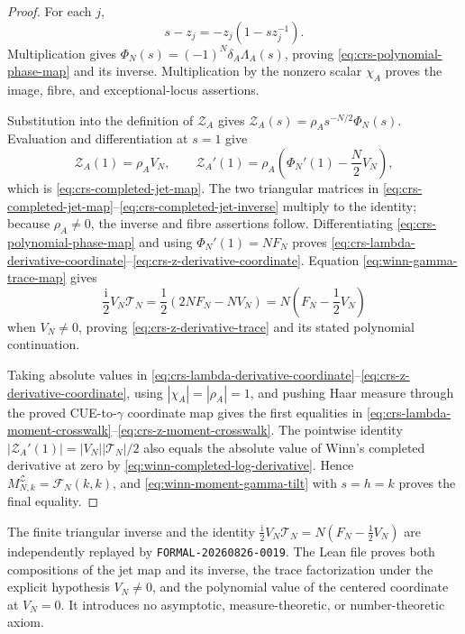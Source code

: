 \begin{proof}
For each $j$,
\[
 s-z_j=-z_j(1-sz_j^{-1}).
\]
Multiplication gives
$\Phi_N(s)=(-1)^N\delta_A\Lambda_A(s)$, proving
\eqref{eq:crs-polynomial-phase-map} and its inverse.  Multiplication by the
nonzero scalar $\chi_A$ proves the image, fibre, and exceptional-locus assertions.

Substitution into the definition of $\mathcal Z_A$ gives
$\mathcal Z_A(s)=\rho_A s^{-N/2}\Phi_N(s)$.  Evaluation and differentiation
at $s=1$ give
\[
 \mathcal Z_A(1)=\rho_A V_N,\qquad
 \mathcal Z_A'(1)=\rho_A\left(\Phi_N'(1)-\frac N2V_N\right),
\]
which is \eqref{eq:crs-completed-jet-map}.  The two triangular matrices in
\eqref{eq:crs-completed-jet-map}--\eqref{eq:crs-completed-jet-inverse}
multiply to the identity; because $\rho_A\ne0$, the inverse and fibre assertions
follow.  Differentiating \eqref{eq:crs-polynomial-phase-map} and using
$\Phi_N'(1)=NF_N$ proves
\eqref{eq:crs-lambda-derivative-coordinate}--\eqref{eq:crs-z-derivative-coordinate}.
Equation \eqref{eq:winn-gamma-trace-map} gives
\[
 \frac{\mathrm i}{2}V_N\mathcal T_N
 =\frac12(2NF_N-NV_N)
 =N\left(F_N-\frac12V_N\right)
\]
when $V_N\ne0$, proving \eqref{eq:crs-z-derivative-trace} and its stated
polynomial continuation.

Taking absolute values in
\eqref{eq:crs-lambda-derivative-coordinate}--\eqref{eq:crs-z-derivative-coordinate},
using $|\chi_A|=|\rho_A|=1$, and pushing Haar measure through the proved
CUE-to-$\gamma$ coordinate map gives the first equalities in
\eqref{eq:crs-lambda-moment-crosswalk}--\eqref{eq:crs-z-moment-crosswalk}.
The pointwise identity
$|\mathcal Z_A'(1)|=|V_N||\mathcal T_N|/2$ also equals the absolute value of
Winn's completed derivative at zero by
\eqref{eq:winn-completed-log-derivative}.  Hence
$M^{\mathcal Z}_{N,k}=\mathcal F_N(k,k)$, and
\eqref{eq:winn-moment-gamma-tilt} with $s=h=k$ proves the final equality.
\end{proof}

The finite triangular inverse and the identity
$\tfrac{\mathrm i}{2}V_N\mathcal T_N=N(F_N-\tfrac12V_N)$ are independently
replayed by \texttt{FORMAL-20260826-0019}.  The Lean file proves both compositions
of the jet map and its inverse, the trace factorization under the explicit hypothesis
$V_N\ne0$, and the polynomial value of the centered coordinate at $V_N=0$.
It introduces no asymptotic, measure-theoretic, or number-theoretic axiom.

